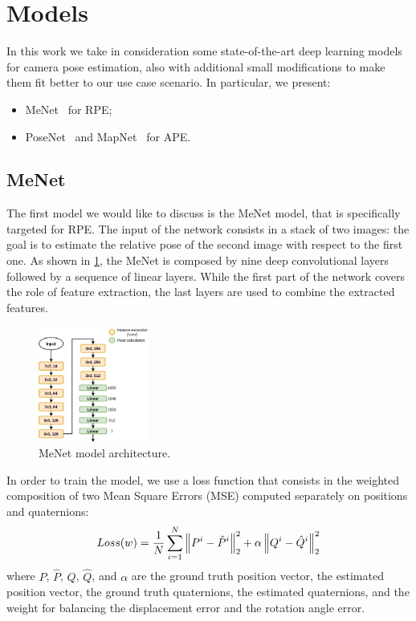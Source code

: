\section{Models}
In this work we take in consideration some state-of-the-art deep learning models for camera pose estimation, also with additional small modifications to make them fit better to our use case scenario.
In particular, we present:
\begin{itemize}
    \item MeNet~\cite{menet} for RPE;
    \item PoseNet~\cite{9348762} and MapNet~\cite{mapnet} for APE.
\end{itemize}

\subsection{MeNet}
The first model we would like to discuss is the MeNet model, that is specifically targeted for RPE.
The input of the network consists in a stack of two images: the goal is to estimate the relative pose of the second image with respect to the first one.
As shown in \cref{fig:menet-structure}, the MeNet is composed by nine deep convolutional layers followed by a sequence of linear layers. While the first part of the network covers the role of feature extraction, the last layers are used to combine the extracted features.
\begin{figure}[htbp]
    \begin{center}
        \includegraphics[width=0.32\textwidth]{./imgs/menet_structure.png}
    \end{center}
    \caption{MeNet model architecture.}
    \label{fig:menet-structure}
\end{figure}

In order to train the model, we use a loss function that consists in the weighted composition of two Mean Square Errors (MSE) computed separately on positions and quaternions:
\begin{equation}
    Loss(w) = \frac{1}{N} \sum\limits_{i=1}^N \norm{P^i - \hat{P}^i}^2_2 + \alpha\norm{Q^i - \hat{Q}^i}^2_2
    \label{eq:menet-loss}
\end{equation}
where $P$, $\hat{P}$, $Q$, $\hat{Q}$, and $\alpha$ are the ground truth position vector, the estimated position vector, the ground truth quaternions, the estimated quaternions, and the weight for balancing the displacement error and the rotation angle error.

